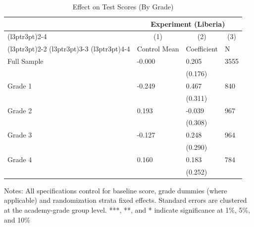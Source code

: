 \begin{table}[!h]
\centering
\caption{Effect on Test Scores (By Grade)}
\centering
\begin{threeparttable}
\begin{tabular}[t]{llll}
\toprule
\multicolumn{1}{c}{ } & \multicolumn{3}{c}{Experiment (Liberia)} \\
\cmidrule(l{3pt}r{3pt}){2-4}
\multicolumn{1}{c}{ } & \multicolumn{1}{c}{(1)} & \multicolumn{1}{c}{(2)} & \multicolumn{1}{c}{(3)} \\
\cmidrule(l{3pt}r{3pt}){2-2} \cmidrule(l{3pt}r{3pt}){3-3} \cmidrule(l{3pt}r{3pt}){4-4}
 & Control Mean & Coefficient & N\\
\midrule
Full Sample & -0.000 & 0.205 & 3555\\
 &  & (0.176) & \\
Grade 1 & -0.249 & 0.467 & 840\\
 &  & (0.311) & \\
Grade 2 & 0.193 & -0.039 & 967\\
 &  & (0.308) & \\
Grade 3 & -0.127 & 0.248 & 964\\
 &  & (0.290) & \\
Grade 4 & 0.160 & 0.183 & 784\\
 &  & (0.252) & \\
\bottomrule
\end{tabular}
\begin{tablenotes}[para]
\item Notes: All specifications control for baseline score, grade dummies (where applicable) and randomization strata fixed effects. Standard errors are clustered at the academy-grade group level. ***, **, and * indicate significance at 1\%, 5\%, and 10\%
\end{tablenotes}
\end{threeparttable}
\end{table}
